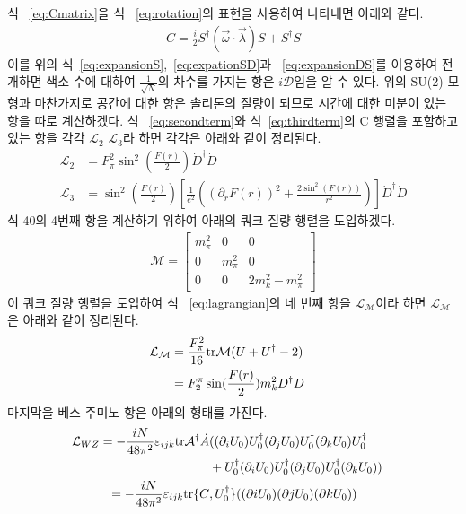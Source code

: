 \documentclass[superscriptaddress,
nofootinbib,byrevtex,fleqn,prd,12pt]{revtex4}
\newcommand{\tr}{\mathrm{tr}}
\begin{document}
식 ~\eqref{eq:Cmatrix}을 식 ~\eqref{eq:rotation}의 표현을 사용하여 나타내면 아래와 같다.
\begin{align}
  C = \frac{i}{2} S^{\dagger} (\vec{\omega} \cdot \vec{\lambda})S + S^{\dagger}\dot{S}
\end{align}
이를 위의 식~\eqref{eq:expansionS},~\eqref{eq:expationSD}과 ~\eqref{eq:expansionDS}를 이용하여 전개하면 색소 수에 대하여 $ \frac{1}{\sqrt{N}}$의 차수를 가지는 항은 $i \mathcal{D}$임을 알 수 있다. 위의 SU(2) 모형과 마찬가지로 공간에 대한 항은 솔리톤의 질량이 되므로
시간에 대한 미분이 있는 항을 따로 계산하겠다. 식 ~\eqref{eq:secondterm}와 식~\eqref{eq:thirdterm}의 C 행렬을 포함하고 있는 항을 각각 $ \mathcal{L}_2$ $\mathcal{L}_{3} $라 하면 각각은 아래와 같이 정리된다.
\begin{align}
  \mathcal{L}_{2} &= F_{\pi}^{2} \sin^{2}\left(\frac{F(r)}{2}\right)\dot{D}^{\dagger}\dot{D} \\
  \mathcal{L}_{3} &=  \sin^{2}\left(\frac{F(r)}{2}\right)\left[\frac{1}{e^{2}}\left( (\partial_{r}F(r))^{2}+\frac{2\sin^{2}(F(r))}{r^{2}}\right) \right]\dot{D}^{\dagger}\dot{D}\label{eq:aboutc}
\end{align}
식 40의 4번째 항을 계산하기 위하여 아래의 쿼크 질량 행렬을 도입하겠다.
\begin{align}
  \mathcal{M}=\left[\begin{array}{ccc}
  m_{\pi}^{2} & 0 & 0 \\
  0 & m_{\pi}^{2} & 0 \\
  0 & 0 & 2m_{k}^{2} -m_{\pi}^{2}
   \end{array} \right]
\end{align}
이 쿼크 질량 행렬\cite{6}을 도입하여 식 ~\eqref{eq:lagrangian}의 네 번째 항을 $\mathcal{L}_{\mathcal{M}}$이라 하면 $\mathcal{L}_{\mathcal{M}}$은 아래와 같이 정리된다.
\begin{align}
  \mathcal{L}_{\mathcal{M}}&=   \frac{F_{\pi}^{2}}{16}\tr \mathcal{M}(U + U^{\dagger} -2 ) \cr
  &= F_{2}^{\pi} \sin(\frac{F(r)}{2})m_{k}^{2} D^{\dagger}D
\end{align}
마지막을 베스-주미노 항은 아래의 형태를 가진다.\cite{5}
\begin{align}
\mathcal{L}_{WZ} = - \frac{iN}{48\pi^{2}} \varepsilon_{ijk} \tr \mathcal{A}^{\dagger} \dot{A}
&((\partial_{i}U_{0})U_{0}^{\dagger}(\partial_{j}U_{0})U_{0}^{\dagger}(\partial_{k}U_{0})U_{0}^{\dagger} \cr
&+ U_{0}^{\dagger}(\partial_{i}U_{0})U_{0}^{\dagger}(\partial_{j}U_{0})U_{0}^{\dagger}(\partial_{k}U_{0})) \cr
 = - \frac{iN}{48\pi^{2}} \varepsilon_{ijk} \tr\{C & ,U_{0}^{\dagger}\}((\partial{i}U_{0})(\partial{j}U_{0})(\partial{k}U_{0}))\label{eq:wessterm}
\end{align}
\end{document}
